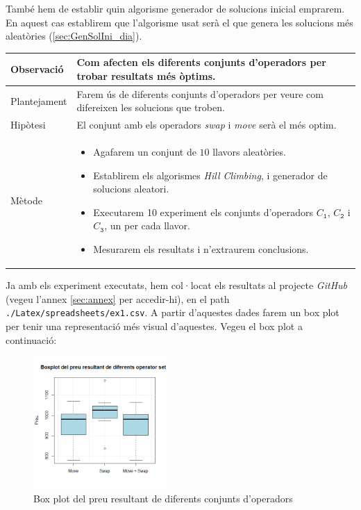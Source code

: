 \documentclass[a4paper]{article}
\begin{document}
	També hem de establir quin algorisme generador de solucions inicial emprarem. En aquest cas establirem que l'algorisme usat serà el que genera les solucions més aleatòries (\ref{sec:GenSolIni_dia}).
	
	\begin{table}[ht]
		\centering
		\begin{tabular}{|l|p{10cm}|}
			\hline
			Observació & Com afecten els diferents conjunts d'operadors per trobar resultats més òptims. \\
			\hline
			Plantejament & Farem ús de diferents conjunts d'operadors per veure com difereixen les solucions que troben. \\
			\hline
			Hipòtesi & El conjunt amb els operadors \textit{swap} i \textit{move} serà el més optim. \\
			\hline
			Mètode & 
			\begin{itemize}
				\item Agafarem un conjunt de $10$ llavors aleatòries.
				\item Establirem els algorismes \textit{Hill Climbing}, i generador de solucions aleatori.
				\item Executarem 10 experiment els conjunts d'operadors $C_{\texttt{1}}$, $C_{\texttt{2}}$ i $C_{\texttt{3}}$, un per cada llavor.
				\item Mesurarem els resultats i n'extraurem conclusions.
			\end{itemize} \\
			\hline
		\end{tabular}
		\label{tab:exp1_apartats}
	\end{table}
	
	Ja amb els experiment executats, hem col·locat els resultats al projecte \textit{GitHub} (vegeu l'annex \ref{sec:annex} per accedir-hi), en el path \texttt{./Latex/spreadsheets/ex1.csv}. A partir d'aquestes dades farem un box plot per tenir una representació més visual d'aquestes. Vegeu el box plot a continuació:
	
	\begin{figure}[H]
		\centering
		\includegraphics[width=0.45\textwidth]{images/exp1_boxplot.png}
		\caption{Box plot del preu resultant de diferents conjunts d'operadors}
		\label{fig:exp1_boxplot}
	\end{figure}
	
\end{document}
